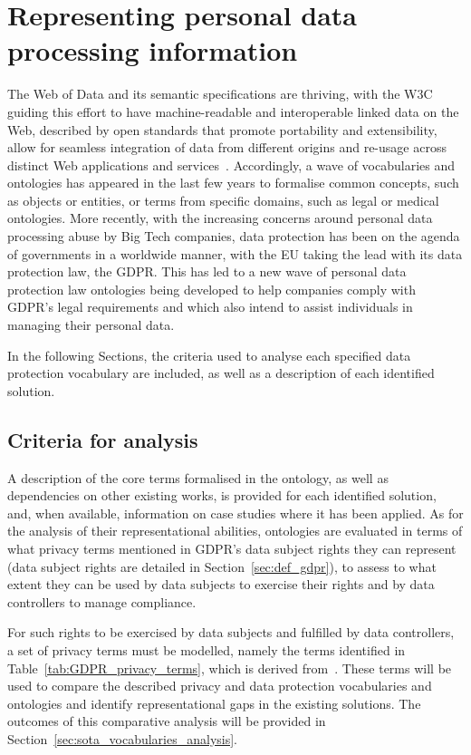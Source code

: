 \section{Representing personal data processing information}
\label{sec:sota_vocabularies}

The Web of Data and its semantic specifications are thriving, with the W3C guiding this effort to have machine-readable and interoperable linked data on the Web, described by open standards that promote portability and extensibility, allow for seamless integration of data from different origins and re-usage across distinct Web applications and services~\citep{berners-lee_semantic_2001}.
Accordingly, a wave of vocabularies and ontologies has appeared in the last few years to formalise common concepts, such as objects or entities, or terms from specific domains, such as legal or medical ontologies.
More recently, with the increasing concerns around personal data processing abuse by Big Tech companies, data protection has been on the agenda of governments in a worldwide manner, with the EU taking the lead with its data protection law, the GDPR.
This has led to a new wave of personal data protection law ontologies being developed to help companies comply with GDPR's legal requirements and which also intend to assist individuals in managing their personal data.

In the following Sections, the criteria used to analyse each specified data protection vocabulary are included, as well as a description of each identified solution.

\subsection{Criteria for analysis}
\label{sec:sota_vocabularies_criteria}

A description of the core terms formalised in the ontology, as well as dependencies on other existing works, is provided for each identified solution, and, when available, information on case studies where it has been applied.
As for the analysis of their representational abilities, ontologies are evaluated in terms of what privacy terms mentioned in GDPR's data subject rights they can represent (data subject rights are detailed in Section~\ref{sec:def_gdpr}), to assess to what extent they can be used by data subjects to exercise their rights and by data controllers to manage compliance.

For such rights to be exercised by data subjects and fulfilled by data controllers, a set of privacy terms must be modelled, namely the terms identified in Table~\ref{tab:GDPR_privacy_terms}, which is derived from~\cite{esteves_analysis_2022}.
These terms will be used to compare the described privacy and data protection vocabularies and ontologies and identify representational gaps in the existing solutions. The outcomes of this comparative analysis will be provided in Section~\ref{sec:sota_vocabularies_analysis}.

